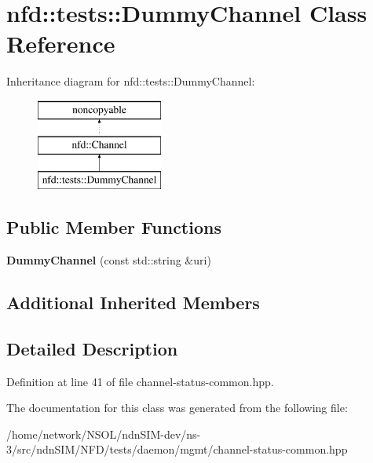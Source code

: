 \hypertarget{classnfd_1_1tests_1_1DummyChannel}{}\section{nfd\+:\+:tests\+:\+:Dummy\+Channel Class Reference}
\label{classnfd_1_1tests_1_1DummyChannel}
Inheritance diagram for nfd\+:\+:tests\+:\+:Dummy\+Channel\+:\begin{figure}[H]
\begin{center}
\leavevmode
\includegraphics[height=3.000000cm]{classnfd_1_1tests_1_1DummyChannel}
\end{center}
\end{figure}
\subsection*{Public Member Functions}
\begin{DoxyCompactItemize}
\item 
{\bfseries Dummy\+Channel} (const std\+::string \&uri)\hypertarget{classnfd_1_1tests_1_1DummyChannel_a6c77e5d0b53f3485e7a70355593775df}{}\label{classnfd_1_1tests_1_1DummyChannel_a6c77e5d0b53f3485e7a70355593775df}

\end{DoxyCompactItemize}
\subsection*{Additional Inherited Members}


\subsection{Detailed Description}


Definition at line 41 of file channel-\/status-\/common.\+hpp.



The documentation for this class was generated from the following file\+:\begin{DoxyCompactItemize}
\item 
/home/network/\+N\+S\+O\+L/ndn\+S\+I\+M-\/dev/ns-\/3/src/ndn\+S\+I\+M/\+N\+F\+D/tests/daemon/mgmt/channel-\/status-\/common.\+hpp\end{DoxyCompactItemize}
